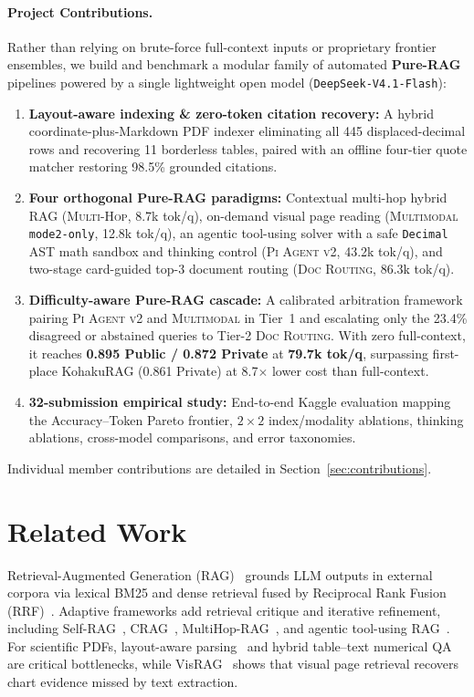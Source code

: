 \documentclass[sigconf,nonacm]{acmart}
\newcommand{\code}[1]{\texttt{\small #1}}
\begin{document}
\paragraph{Project Contributions.}
Rather than relying on brute-force full-context inputs or proprietary frontier ensembles, we build and benchmark a modular family of automated \textbf{Pure-RAG} pipelines powered by a single lightweight open model (\code{DeepSeek-V4.1-Flash}):
\begin{enumerate}
  \item \textbf{Layout-aware indexing \& zero-token citation recovery:} A hybrid coordinate-plus-Markdown PDF indexer eliminating all 445 displaced-decimal rows and recovering 11 borderless tables, paired with an offline four-tier quote matcher restoring 98.5\% grounded citations.
  \item \textbf{Four orthogonal Pure-RAG paradigms:} Contextual multi-hop hybrid RAG (\textsc{Multi-Hop}, 8.7k tok/q), on-demand visual page reading (\textsc{Multimodal} \code{mode2-only}, 12.8k tok/q), an agentic tool-using solver with a safe \code{Decimal} AST math sandbox and thinking control (\textsc{Pi Agent v2}, 43.2k tok/q), and two-stage card-guided top-3 document routing (\textsc{Doc Routing}, 86.3k tok/q).
  \item \textbf{Difficulty-aware Pure-RAG cascade:} A calibrated arbitration framework pairing \textsc{Pi Agent v2} and \textsc{Multimodal} in Tier~1 and escalating only the 23.4\% disagreed or abstained queries to Tier-2 \textsc{Doc Routing}. With zero full-context, it reaches \textbf{0.895 Public / 0.872 Private} at \textbf{79.7k tok/q}, surpassing first-place KohakuRAG (0.861 Private) at 8.7$\times$ lower cost than full-context.
  \item \textbf{32-submission empirical study:} End-to-end Kaggle evaluation mapping the Accuracy--Token Pareto frontier, $2\times 2$ index/modality ablations, thinking ablations, cross-model comparisons, and error taxonomies.
\end{enumerate}
Individual member contributions are detailed in Section~\ref{sec:contributions}.

\section{Related Work}
\label{sec:related}

Retrieval-Augmented Generation (RAG)~\cite{lewis2020rag} grounds LLM outputs in external corpora via lexical BM25 and dense retrieval fused by Reciprocal Rank Fusion (RRF)~\cite{cormack2009rrf}. Adaptive frameworks add retrieval critique and iterative refinement, including Self-RAG~\cite{asai2024selfrag}, CRAG~\cite{yan2024crag}, MultiHop-RAG~\cite{tang2024multihoprag}, and agentic tool-using RAG~\cite{singh2025agenticrag}. For scientific PDFs, layout-aware parsing~\cite{auer2024docling} and hybrid table--text numerical QA~\cite{zhu2021tatqa} are critical bottlenecks, while VisRAG~\cite{yu2024visrag} shows that visual page retrieval recovers chart evidence missed by text extraction.
\end{document}
